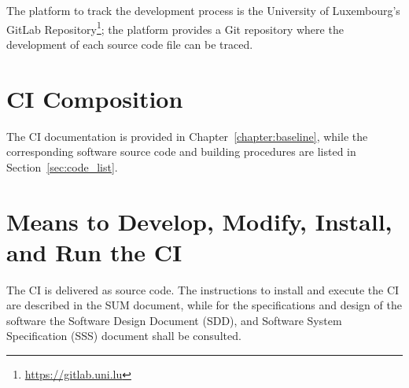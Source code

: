The platform to track the development process is the University of Luxembourg's GitLab Repository\footnote{\url{https://gitlab.uni.lu}}; the platform provides a Git repository where the development of each source code file can be traced.

\section{CI Composition}

The CI documentation is provided in Chapter~\ref{chapter:baseline}, while the corresponding software source code and building procedures are listed in Section~\ref{sec:code_list}.

\section{Means to Develop, Modify, Install, and Run the CI}

The CI is delivered as source code. The instructions to install and execute the CI are described in the SUM document, while for the specifications and design of the software the Software Design Document (SDD), and Software System Specification (SSS) document shall be consulted.

